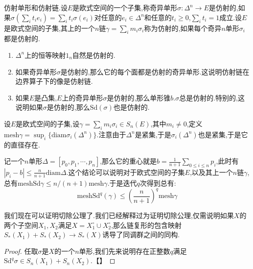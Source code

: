 仿射单形和仿射链.设$E$是欧式空间的一个子集,称奇异单形$\sigma:\Delta^n\to E$是仿射的,如果$\sigma(\sum_it_ie_i)=\sum_it_i\sigma(e_i)$对任意的$e_i\in\Delta^n$和任意的$t_i\ge0$,$\sum_it_i=1$成立.设$E$是欧式空间的子集,其上的一个$n$链$\gamma=\sum_im_i\sigma_i$称为仿射的,如果每个奇异$n$单形$\sigma_i$都是仿射的.
\begin{enumerate}
	\item $\Delta^n$上的恒等映射$1_n$自然是仿射的.
	\item 如果奇异单形$\sigma$是仿射的,那么它的每个面都是仿射的奇异单形.这说明仿射链在边界算子下的像是仿射链.
	\item 如果$E$是凸集,$E$上的奇异单形$\sigma$是仿射的,那么单形锥$b.\sigma$总是仿射的.特别的,这说明如果$\sigma$是仿射的,那么$\mathrm{Sd}(\sigma)$也是仿射的.
\end{enumerate}

设$E$是欧式空间的子集,设$\gamma=\sum_im_i\sigma_i\in S_n(E)$,其中$m_i\not=0$,定义$\mathrm{mesh}\gamma=\sup_i\{\mathrm{diam}\sigma_i(\Delta^n)\}$.注意由于$\Delta^n$是紧集,于是$\sigma_i(\Delta^n)$也是紧集,于是它的直径存在.

记一个$n$单形$\Delta=[p_0,p_1,\cdots,p_n]$,那么它的重心就是$b=\frac{1}{n+1}\sum_{0\le i\le n}p_i$,此时有$|p_i-b|\le\frac{n}{n+1}\mathrm{diam}\Delta$.这个结论可以说明对于欧式空间的子集$E$,以及其上一个$n$链$\gamma$,总有$\mathrm{mesh}\mathrm{Sd}\gamma\le n/(n+1)\mathrm{mesh}\gamma$.于是迭代$q$次得到总有:
$$\mathrm{mesh}\mathrm{Sd}^q(\gamma)\le(\frac{n}{n+1})^q\mathrm{mesh}\gamma$$

我们现在可以证明切除公理了.我们已经解释过为证明切除公理,仅需说明如果$X$的两个子空间$X_1,X_2$满足$X=X_1^{\circ}\cup X_2^{\circ}$,那么链复形的包含映射$S_*(X_1)+S_*(X_2)\to S_*(X)$诱导了同调群之间的同构.
\begin{proof}
	
	任取$\sigma$是$X$的一个$n$单形,我们先来说明存在正整数$q$满足$\mathrm{Sd}^q\sigma\in S_n(X_1)+S_n(X_2)$.【】
	
\end{proof}

